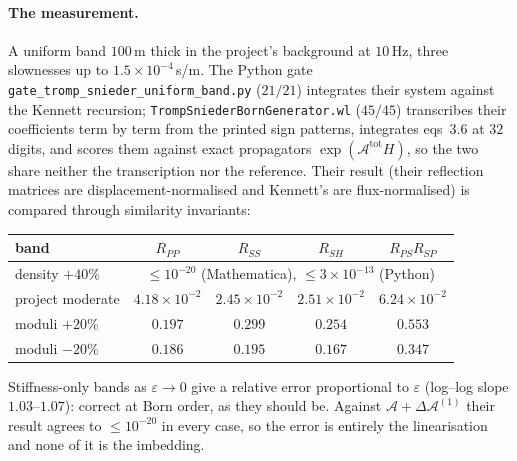 \documentclass[11pt,a4paper]{article}
\newcommand{\Aop}{\mathcal{A}}
\newcommand{\dA}{\Delta\mathcal{A}}
\begin{document}
\paragraph{The measurement.}  A uniform band $100$\,m thick in the project's
background at $10$\,Hz, three slownesses up to $1.5\times10^{-4}$\,s/m.  The
Python gate \verb|gate_tromp_snieder_uniform_band.py| ($21/21$) integrates their
system against the Kennett recursion; \verb|TrompSniederBornGenerator.wl|
($45/45$) transcribes their coefficients term by term from the printed sign
patterns, integrates eqs~3.6 at $32$ digits, and scores them against exact
propagators $\exp(\Aop^{\text{tot}}H)$, so the two share neither the
transcription nor the reference.  Their result (their reflection matrices
are displacement-normalised and Kennett's are flux-normalised) is compared
through similarity invariants:
\begin{center}
\begin{tabular}{@{}lcccc@{}}
\toprule
band & $R_{PP}$ & $R_{SS}$ & $R_{SH}$ & $R_{PS}R_{SP}$\\
\midrule
density $+40\%$            & \multicolumn{4}{c}{$\le 10^{-20}$ (Mathematica), $\le 3\times10^{-13}$ (Python)}\\
project moderate & $4.18\times10^{-2}$ & $2.45\times10^{-2}$ & $2.51\times10^{-2}$ & $6.24\times10^{-2}$\\
moduli $+20\%$             & $0.197$ & $0.299$ & $0.254$ & $0.553$\\
moduli $-20\%$             & $0.186$ & $0.195$ & $0.167$ & $0.347$\\
\bottomrule
\end{tabular}
\end{center}
\noindent
Stiffness-only bands as $\varepsilon\to0$ give a relative error proportional to
$\varepsilon$ (log--log slope $1.03$--$1.07$): correct at Born order, as they
should be.  Against $\Aop+\dA^{(1)}$ their result agrees to $\le10^{-20}$ in
every case, so the error is entirely the linearisation and none of it is the
imbedding.
\end{document}
